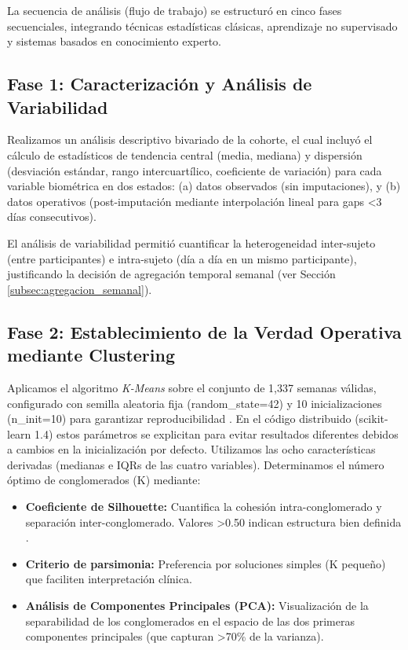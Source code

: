 La secuencia de análisis (flujo de trabajo) se estructuró en cinco fases secuenciales, integrando técnicas estadísticas clásicas, aprendizaje no supervisado y sistemas basados en conocimiento experto.

\subsection{Fase 1: Caracterización y Análisis de Variabilidad}
\label{subsec:fase1_caracterizacion}

Realizamos un análisis descriptivo bivariado de la cohorte, el cual incluyó el cálculo de estadísticos de tendencia central (media, mediana) y dispersión (desviación estándar, rango intercuartílico, coeficiente de variación) para cada variable biométrica en dos estados: (a) datos observados (sin imputaciones), y (b) datos operativos (post-imputación mediante interpolación lineal para gaps <3 días consecutivos).

El análisis de variabilidad permitió cuantificar la heterogeneidad inter-sujeto (entre participantes) e intra-sujeto (día a día en un mismo participante), justificando la decisión de agregación temporal semanal (ver Sección \ref{subsec:agregacion_semanal}).

\subsection{Fase 2: Establecimiento de la Verdad Operativa mediante Clustering}
\label{subsec:fase2_clustering}

Aplicamos el algoritmo \textit{K-Means} sobre el conjunto de 1,337 semanas válidas, configurado con semilla aleatoria fija (random\_state=42) y 10 inicializaciones (n\_init=10) para garantizar reproducibilidad \cite{Pedregosa2011sklearn}. En el código distribuido (scikit-learn 1.4) estos parámetros se explicitan para evitar resultados diferentes debidos a cambios en la inicialización por defecto. Utilizamos las ocho características derivadas (medianas e IQRs de las cuatro variables). Determinamos el número óptimo de conglomerados (K) mediante:

\begin{itemize}
    \item \textbf{Coeficiente de Silhouette:} Cuantifica la cohesión intra-conglomerado y separación inter-conglomerado. Valores >0.50 indican estructura bien definida \cite{Rousseeuw1987}.
    
    \item \textbf{Criterio de parsimonia:} Preferencia por soluciones simples (K pequeño) que faciliten interpretación clínica.
    
    \item \textbf{Análisis de Componentes Principales (PCA):} Visualización de la separabilidad de los conglomerados en el espacio de las dos primeras componentes principales (que capturan >70\% de la varianza).
\end{itemize}

